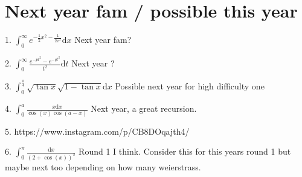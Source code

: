 \documentclass{article}
\newcommand{\dd}{\mathrm{d}}
\begin{document}
\section{Next year fam / possible this year}

1. $\int_0^{\infty} e^{-\frac{1}{2}x^2-\frac{1}{2x^2}} \dd x$ Next year fam? \newline  \newline \newline 

2. $\int_0^{\infty} \frac{e^{-pt^2}-e^{-qt^2}}{t^2} \dd t$ Next year ? \newline  \newline \newline 

3. $\int_0^{\frac{\pi}{4}} \sqrt{\tan{x}}\sqrt{1-\tan{x}} \dd x$ Possible next year for high difficulty one \newline  \newline \newline 

4.  $\int_0^a \frac{x \dd x}{\cos(x)\cos(a-x)}$ Next year, a great recursion. \newline  \newline \newline 

5. https://www.instagram.com/p/CB8DOqajth4/ 


6.  $\int_0^{\pi} \frac{\dd x}{(2+\cos(x))^3} $ Round 1 I think. Consider this for this years round 1 but maybe next too depending on how many weierstrass. \newline  \newline \newline 
\end{document}
